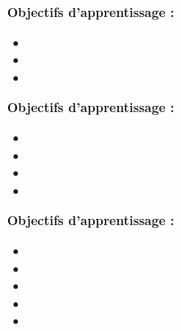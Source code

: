 \par\noindent\textbf{Objectifs d'apprentissage :}
\begin{itemize}
    \item \useobj[C4C3ba]
    \item \useobj[C4C3bb]
    \item \useobj[C4C3bc]
\end{itemize}
\endsequence

\par\noindent\textbf{Objectifs d'apprentissage :}
\begin{itemize}
    \item \useobj[C4B3ba]
    \item \useobj[C4B3bb]
    \item \useobj[C4B3bc]
    \item \useobj[C4B3bd]
\end{itemize}
\endsequence

\par\noindent\textbf{Objectifs d'apprentissage :}
\begin{itemize}
    \item \useobj[C4E3aa]
    \item \useobj[C4E3ab]
    \item \useobj[C4E3ac]
    \item \useobj[C4E3ad]
    \item \useobj[C4E3ae]
\end{itemize}
\endsequence

\endlevel
